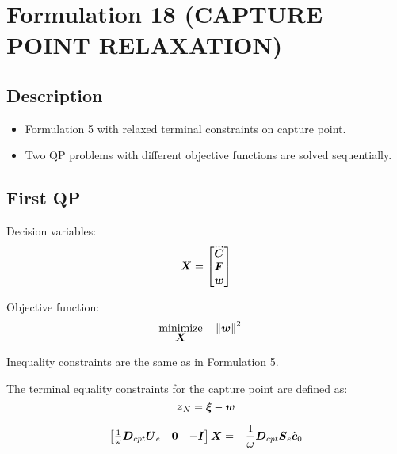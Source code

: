 \section{Formulation 18 (CAPTURE POINT RELAXATION)}\label{sec.form05}


\subsection{Description}
\begin{itemize}
    \item Formulation 5 with relaxed terminal constraints on capture point.
    \item Two QP problems with different objective functions are solved sequentially.
\end{itemize}



\subsection{First QP}

Decision variables:
\begin{equation*}
    \V{X} = 
    \begin{bmatrix}
        \cJerk \\
        \FD \\
        \V{w} \\
    \end{bmatrix}
\end{equation*}

Objective function:
\begin{equation*}
\begin{split}
    \underset{\mbox{\boldmath $X$}}{\operatorname{minimize}}\quad    & \left\lVert\mbox{\boldmath $w$}\right\rVert^2
\end{split}
\end{equation*}

Inequality constraints are the same as in Formulation 5.

The terminal equality constraints for the capture point are defined as:
\begin{equation*}
    \mbox{\boldmath $z$}_N = \mbox{\boldmath $\xi$} - \mbox{\boldmath $w$}
\end{equation*}

\begin{align*}
    \begin{bmatrix}
        \frac{1}{\omega}\mbox{\boldmath $D$}_{cpt} \mbox{\boldmath $U$}_e     &   \mbox{\boldmath $0$}   &   -\mbox{\boldmath $I$}\\
    \end{bmatrix}
    \mbox{\boldmath $X$}
    = -\frac{1}{\omega}\mbox{\boldmath $D$}_{cpt} \mbox{\boldmath $S$}_e \hat{\mbox{\boldmath $c$}}_0
\end{align*}


